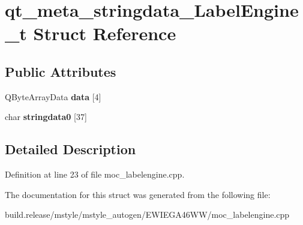 \hypertarget{structqt__meta__stringdata___label_engine__t}{}\section{qt\+\_\+meta\+\_\+stringdata\+\_\+\+Label\+Engine\+\_\+t Struct Reference}
\label{structqt__meta__stringdata___label_engine__t}
\subsection*{Public Attributes}
\begin{DoxyCompactItemize}
\item 
\mbox{\label{structqt__meta__stringdata___label_engine__t_afee293102d8522a3bb5543fd7071d163}} 
Q\+Byte\+Array\+Data {\bfseries data} \mbox{[}4\mbox{]}
\item 
\mbox{\label{structqt__meta__stringdata___label_engine__t_a6fb353c68b7a2b7ed3044735b5a8842d}} 
char {\bfseries stringdata0} \mbox{[}37\mbox{]}
\end{DoxyCompactItemize}


\subsection{Detailed Description}


Definition at line 23 of file moc\+\_\+labelengine.\+cpp.



The documentation for this struct was generated from the following file\+:\begin{DoxyCompactItemize}
\item 
build.\+release/mstyle/mstyle\+\_\+autogen/\+E\+W\+I\+E\+G\+A46\+W\+W/moc\+\_\+labelengine.\+cpp\end{DoxyCompactItemize}
